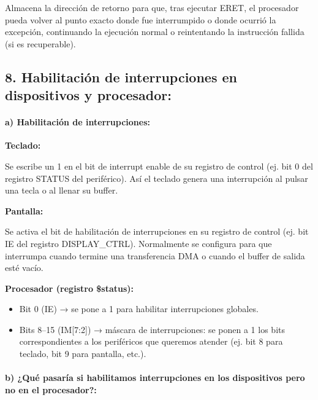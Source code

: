 \documentclass[12pt]{article}
\begin{document}
Almacena la dirección de retorno para que, tras ejecutar ERET, el procesador pueda volver al punto exacto donde fue interrumpido o donde ocurrió la excepción, continuando la ejecución normal o reintentando la instrucción fallida (si es recuperable).

\begin{center}
\subsection*{8. Habilitación de interrupciones en dispositivos y procesador:}
\end{center}

\paragraph*{a) Habilitación de interrupciones:}

\vspace{0.2cm}

\textbf{Teclado:}

Se escribe un 1 en el bit de interrupt enable de su registro de control (ej. bit 0 del registro STATUS del periférico). Así el teclado genera una interrupción al pulsar una tecla o al llenar su buffer.

\textbf{Pantalla:}

Se activa el bit de habilitación de interrupciones en su registro de control (ej. bit IE del registro DISPLAY\_CTRL). Normalmente se configura para que interrumpa cuando termine una transferencia DMA o cuando el buffer de salida esté vacío.

\vspace{0.2cm}

\textbf{Procesador (registro \$status):}

\begin{itemize}
    \item Bit 0 (IE) → se pone a 1 para habilitar interrupciones globales.
    \item Bits 8–15 (IM[7:2]) → máscara de interrupciones: se ponen a 1 los bits correspondientes a los periféricos que queremos atender (ej. bit 8 para teclado, bit 9 para pantalla, etc.).
\end{itemize}

\vspace{0.2cm}

\paragraph*{b) ¿Qué pasaría si habilitamos interrupciones en los dispositivos pero no en el procesador?:}
\end{document}
